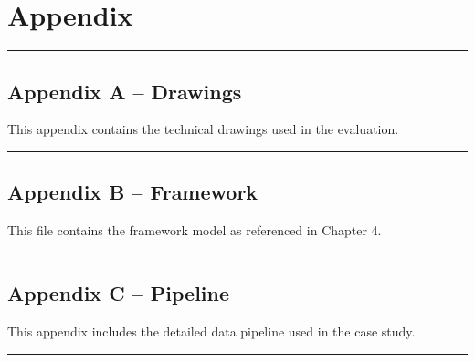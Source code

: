 \chapter*{Appendix}
\label{sec:appendix}

\noindent\rule{\linewidth}{0.4pt}

\section*{Appendix A -- Drawings}
This appendix contains the technical drawings used in the evaluation.\\

\noindent\rule{\linewidth}{0.4pt}

\section*{Appendix B -- Framework}
This file contains the framework model as referenced in Chapter 4.\\

\noindent\rule{\linewidth}{0.4pt}

\section*{Appendix C -- Pipeline}
This appendix includes the detailed data pipeline used in the case study.\\

\noindent\rule{\linewidth}{0.4pt}
